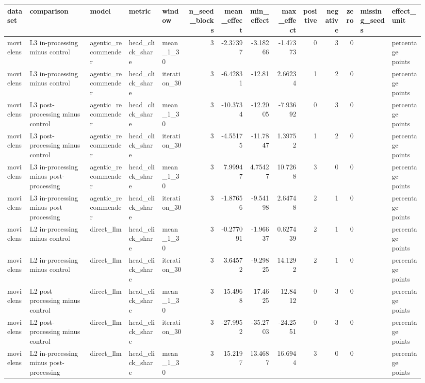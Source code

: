 \begin{table}[htbp!]
\centering
\small
\setlength{\tabcolsep}{3pt}
\renewcommand{\arraystretch}{1.1}
\begin{tabular}{lllllrrrrrrrll}
\hline
dataset & comparison & model & metric & window & n\_seed\_blocks & mean\_effect & min\_effect & max\_effect & positive & negative & zero & missing\_seeds & effect\_unit \\
\hline
movielens & L3 in-processing minus control & agentic\_recommender & head\_click\_share & mean\_1\_30 & 3 & -2.37397 & -3.18266 & -1.47373 & 0 & 3 & 0 &  & percentage points \\
movielens & L3 in-processing minus control & agentic\_recommender & head\_click\_share & iteration\_30 & 3 & -6.42831 & -12.81 & 2.66234 & 1 & 2 & 0 &  & percentage points \\
movielens & L3 post-processing minus control & agentic\_recommender & head\_click\_share & mean\_1\_30 & 3 & -10.3734 & -12.2005 & -7.93692 & 0 & 3 & 0 &  & percentage points \\
movielens & L3 post-processing minus control & agentic\_recommender & head\_click\_share & iteration\_30 & 3 & -4.55175 & -11.7847 & 1.39752 & 1 & 2 & 0 &  & percentage points \\
movielens & L3 in-processing minus post-processing & agentic\_recommender & head\_click\_share & mean\_1\_30 & 3 & 7.99947 & 4.75427 & 10.7268 & 3 & 0 & 0 &  & percentage points \\
movielens & L3 in-processing minus post-processing & agentic\_recommender & head\_click\_share & iteration\_30 & 3 & -1.87656 & -9.54198 & 2.64748 & 2 & 1 & 0 &  & percentage points \\
movielens & L2 in-processing minus control & direct\_llm & head\_click\_share & mean\_1\_30 & 3 & -0.277091 & -1.96637 & 0.627439 & 2 & 1 & 0 &  & percentage points \\
movielens & L2 in-processing minus control & direct\_llm & head\_click\_share & iteration\_30 & 3 & 3.64572 & -9.29825 & 14.1292 & 2 & 1 & 0 &  & percentage points \\
movielens & L2 post-processing minus control & direct\_llm & head\_click\_share & mean\_1\_30 & 3 & -15.4968 & -17.4625 & -12.8412 & 0 & 3 & 0 &  & percentage points \\
movielens & L2 post-processing minus control & direct\_llm & head\_click\_share & iteration\_30 & 3 & -27.9952 & -35.2703 & -24.2551 & 0 & 3 & 0 &  & percentage points \\
movielens & L2 in-processing minus post-processing & direct\_llm & head\_click\_share & mean\_1\_30 & 3 & 15.2197 & 13.4687 & 16.6944 & 3 & 0 & 0 &  & percentage points \\

\end{tabular}
\end{table}
